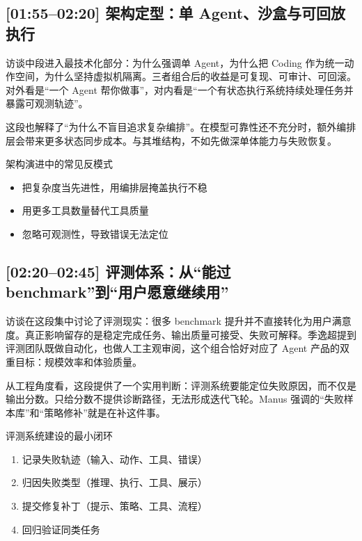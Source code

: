 \subsection{[01:55--02:20] 架构定型：单 Agent、沙盒与可回放执行}

访谈中段进入最技术化部分：为什么强调单 Agent，为什么把 Coding 作为统一动作空间，为什么坚持虚拟机隔离。三者组合后的收益是可复现、可审计、可回滚。对外看是“一个 Agent 帮你做事”，对内看是“一个有状态执行系统持续处理任务并暴露可观测轨迹”。

这段也解释了“为什么不盲目追求复杂编排”。在模型可靠性还不充分时，额外编排层会带来更多状态同步成本。与其堆结构，不如先做深单体能力与失败恢复。

\begin{warningbox}{架构演进中的常见反模式}
\begin{itemize}
    \item 把复杂度当先进性，用编排层掩盖执行不稳
    \item 用更多工具数量替代工具质量
    \item 忽略可观测性，导致错误无法定位
\end{itemize}
\end{warningbox}

\subsection{[02:20--02:45] 评测体系：从“能过 benchmark”到“用户愿意继续用”}

访谈在这段集中讨论了评测现实：很多 benchmark 提升并不直接转化为用户满意度。真正影响留存的是稳定完成任务、输出质量可接受、失败可解释。季逸超提到评测团队既做自动化，也做人工主观审阅，这个组合恰好对应了 Agent 产品的双重目标：规模效率和体验质量。

从工程角度看，这段提供了一个实用判断：评测系统要能定位失败原因，而不仅是输出分数。只给分数不提供诊断路径，无法形成迭代飞轮。Manus 强调的“失败样本库”和“策略修补”就是在补这件事。

\begin{importantbox}{评测系统建设的最小闭环}
\begin{enumerate}
    \item 记录失败轨迹（输入、动作、工具、错误）
    \item 归因失败类型（推理、执行、工具、展示）
    \item 提交修复补丁（提示、策略、工具、流程）
    \item 回归验证同类任务
\end{enumerate}
\end{importantbox}

